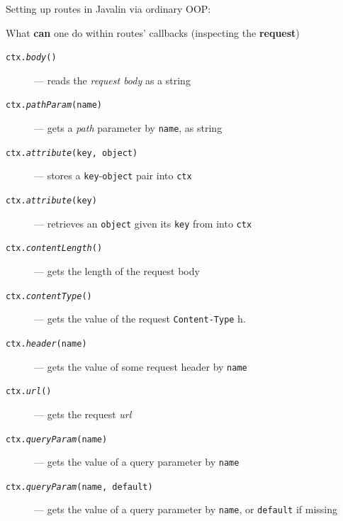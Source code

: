 \documentclass[presentation]{beamer}\mode<presentation>{\usetheme{AMSBolognaFC}}
\begin{document}
\begin{frame}[allowframebreaks]
    \framebreak

    Setting up routes in Javalin via ordinary OOP:
    

    \framebreak

    \begin{block}{What \textbf{can} one do within routes' callbacks (inspecting the \textbf{request})}
        \begin{description}
            \item[\texttt{ctx.\textit{body}()}] --- reads the \emph{request body} as a string
            \item[\texttt{ctx.\textit{pathParam}(name)}] --- gets a \emph{path} parameter by \texttt{name}, as string
            \item[\texttt{ctx.\textit{attribute}(key, object)}] --- stores a \texttt{key}-\texttt{object} pair into \texttt{ctx}
            \item[\texttt{ctx.\textit{attribute}(key)}] --- retrieves an \texttt{object} given its \texttt{key} from into \texttt{ctx}
            \item[\texttt{ctx.\textit{contentLength}()}] --- gets the length of the request body
            \item[\texttt{ctx.\textit{contentType}()}] --- gets the value of the request \texttt{Content-Type} h.
            \item[\texttt{ctx.\textit{header}(name)}] --- gets the value of some request header by \texttt{name}
            \item[\texttt{ctx.\textit{url}()}] --- gets the request \emph{url}
            \item[\texttt{ctx.\textit{queryParam}(name)}] --- gets the value of a query parameter by \texttt{name}
            \item[\texttt{ctx.\textit{queryParam}(name, default)}] --- gets the value of a query parameter by \texttt{name}, or \texttt{default} if missing
        \end{description}
    \end{block}

    \framebreak


\end{frame}
\end{document}
